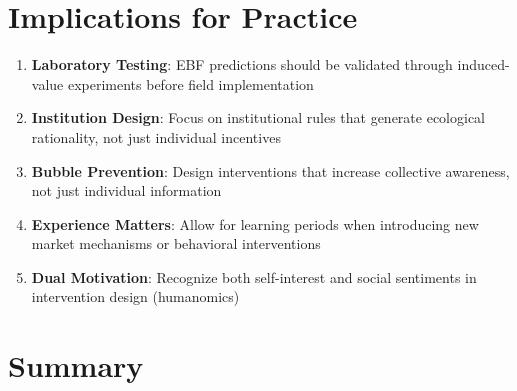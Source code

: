 \section{Implications for Practice}
\label{sec:vs-practice}

\begin{tcolorbox}[colback=green!5!white, colframe=green!75!black,
    title=Practical Implications]
\begin{enumerate}
\item \textbf{Laboratory Testing}: EBF predictions should be validated through
      induced-value experiments before field implementation
\item \textbf{Institution Design}: Focus on institutional rules that generate
      ecological rationality, not just individual incentives
\item \textbf{Bubble Prevention}: Design interventions that increase collective
      awareness, not just individual information
\item \textbf{Experience Matters}: Allow for learning periods when introducing
      new market mechanisms or behavioral interventions
\item \textbf{Dual Motivation}: Recognize both self-interest and social
      sentiments in intervention design (humanomics)
\end{enumerate}
\end{tcolorbox}


\section{Summary}
\label{sec:vs-summary}

